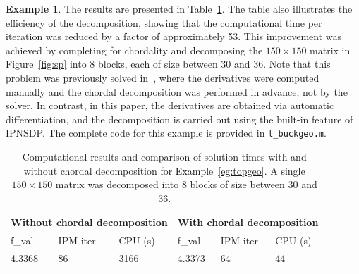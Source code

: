 \documentclass[]{interact}
\theoremstyle{plain}%
\theoremstyle{definition}
\newtheorem{example}[theorem]{Example}
\theoremstyle{remark}
\begin{document}
\begin{example}
The results are presented in Table~\ref{tab:chord_eff}. The table also illustrates the efficiency of the decomposition, showing that the computational time per iteration was reduced by a factor of approximately 53. This improvement was achieved by completing for chordality and  decomposing the $150 \times 150$ matrix in Figure~\ref{fig:sp} into 8 blocks, each of size between 30 and 36. Note that this problem was previously solved in~\cite{Weldeyesus2024}, where the derivatives were computed manually and the chordal decomposition was performed in advance, not by the solver. In contrast, in this paper, the derivatives are obtained via automatic differentiation, and the decomposition is carried out using the built-in feature of IPNSDP. The complete code for this example is provided in \texttt{t\_buckgeo.m}.
\begin{table}
\centering
\caption{Computational results and comparison of solution times with and without chordal decomposition for Example~\ref{eg:topgeo}. A single $150 \times 150$ matrix was decomposed into 8 blocks of size between 30 and 36.}

\begin{tabular}{lll|lll}
\toprule
\multicolumn{3}{c|}{Without chordal decomposition} & \multicolumn{3}{c}{With chordal decomposition} \\
\midrule
f\_val & IPM iter & CPU (s) & f\_val & IPM iter & CPU (s) \\
\midrule
4.3368 & 86 & 3166 & 4.3373 & 64 & 44 \\
\bottomrule
\end{tabular}\label{tab:chord_eff}
\end{table}
\end{example}
\end{document}
